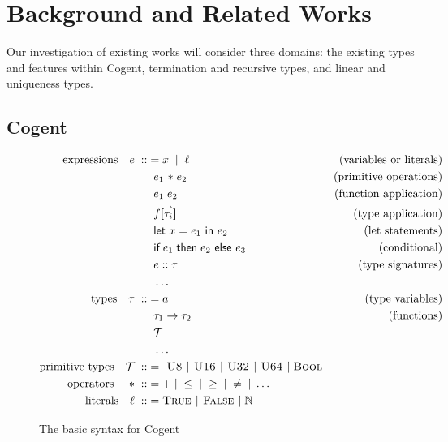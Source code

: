 \chapter{Background and Related Works}\label{ch:background}

Our investigation of existing works will consider three domains: the existing types and features
within Cogent, termination and recursive types, and linear and uniqueness types.

\section{Cogent}
\begin{figure}
    \centering

    \begin{align*}
    \text{expressions}\quad e\; ::&= x\;\; |\;\; \ell & \text{(variables or literals)} \\
                &|\; e_1 \text{ \textasteriskcentered }\; e_2 & \text{(primitive operations)} \\
                &|\; e_1\; e_2 & \text{(function application)} \\
                &|\; f\textbf{[}\harpoon{\tau_i}\textbf{]} & \text{(type application)} \\
                &|\; \textsf{let } x = e_1 \textsf{ in } e_2 & \text{(let statements)} \\
                &|\; \textsf{if}\; e_1\; \textsf{then}\; e_2 \textsf{ else } e_3 & \text{(conditional)} \\
                &|\; e :: \tau & \text{(type signatures)} \\
                &|\; \dots \\
        \text{types}\quad \tau\; ::&= a & \text{(type variables)} \\
              &|\; \tau_1 \rightarrow \tau_2 & \text{(functions)} \\
              &|\; \mathcal{T} \\
              &|\; \dots \\
        \text{primitive types}\quad \mathcal{T}\; ::&= \textsc{ U8 } | \textsc{ U16 } | \textsc{ U32 } | \textsc{ U64 } |\; \textsc{Bool} \\
        \text{operators \ \ \ \textasteriskcentered }\; ::&= +\; |\; \leq\; |\; \geq\; |\; \neq\; |\; \dots \\
        \text{literals}\quad \ell\; ::&= \textsc{True } | \textsc{ False } |\; \mathbb{N}  \\
    \end{align*}

    \caption{The basic syntax for Cogent~\citep{LiamThesis}}
    \label{fig:cogentGrammar}
\end{figure}

